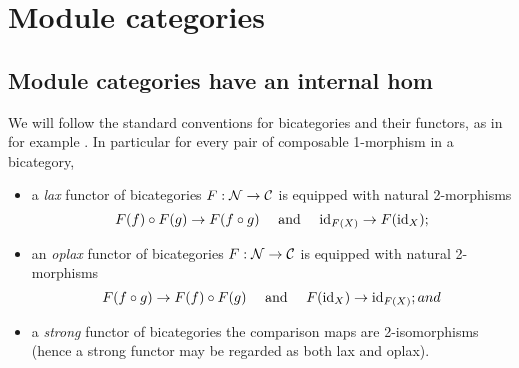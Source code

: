 \documentclass{amsart}
\begin{document}


\section{Module categories} \label{sec:tc-bimod}

\subsection{Module categories have an internal hom}

We will follow the standard conventions for bicategories and their functors, as in for example \cite{MR2664622}. In particular for every pair of composable 1-morphism in a bicategory, 
\begin{itemize}
	\item a {\em lax} functor of bicategories $F: \mathcal N \to \mathcal C$ is equipped with natural 2-morphisms
	\begin{equation*}
		F(f) \circ F(g) \to F(f \circ g) \quad \textrm{ and } \quad \mathrm{id}_{F(X)} \to F(\mathrm{id}_X);
	\end{equation*} 
	\item an {\em oplax} functor of bicategories $F: \mathcal N \to \mathcal C$ is equipped with natural 2-morphisms
	\begin{equation*}
		F(f \circ g) \to F(f) \circ F(g)   \quad \textrm{ and } \quad F(\mathrm{id}_X) \to \mathrm{id}_{F(X)}; and
	\end{equation*}
	\item a {\em strong} functor of bicategories the comparison maps are 2-isomorphisms (hence a strong functor may be regarded as both lax and oplax). 
\end{itemize}
\end{document}

